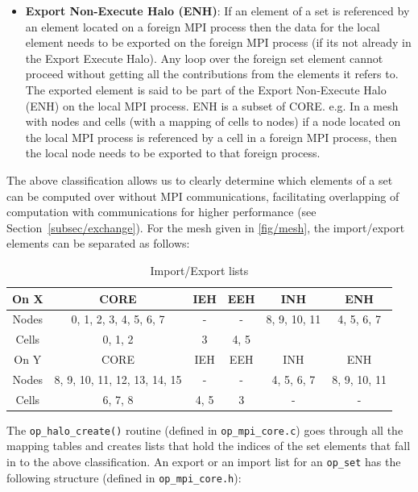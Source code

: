 \documentclass[11pt]{article}
\begin{document}
\begin{itemize}
\item \textbf{Export Non-Execute Halo (ENH)}: If an element of a set is referenced by an element located on a foreign
MPI process then the data for the local element needs to be exported on the foreign MPI process (if its not already in
the Export Execute Halo). Any loop over the foreign set element cannot proceed without getting all the contributions
from the elements it refers to. The exported element is said to be part of the Export Non-Execute Halo (ENH) on the
local MPI process. ENH is a subset of CORE. e.g. In a mesh with nodes and cells (with a mapping of cells to nodes) if a
node located on the local MPI process is referenced by a cell in a foreign MPI process, then the local node needs to be
exported to that foreign process.
\end{itemize}

\noindent The above classification allows us to clearly determine which elements of a set can be computed over without
MPI communications, facilitating overlapping of computation with communications for higher performance (see
Section~\ref{subsec/exchange}). For the mesh given in \figurename{ \ref{fig/mesh}}, the import/export elements can be
separated as follows:


\begin{table}[ht]
\centering\vspace{-10pt}
\caption{Import/Export lists}
\begin{tabular}{|c|c|c|c|c|c|} \hline
On X  & CORE        & IEH & EEH   & INH   & ENH     \\\hline
Nodes & 0, 1, 2, 3, 4, 5, 6, 7  & - & - & 8, 9, 10, 11  & 4, 5, 6, 7  \\\hline
Cells & 0, 1, 2     & 3 & 4, 5  &   &\\\hline\hline
On Y  & CORE        & IEH & EEH & INH   & ENH \\\hline
Nodes & 8, 9, 10, 11, 12, 13, 14, 15  & - & - & 4, 5, 6, 7  & 8, 9, 10, 11  \\\hline
Cells & 6, 7, 8     & 4, 5  & 3 & -   & -   \\\hline
\end{tabular}\label{tab/impexp}\vspace{-0pt}
\end{table}

\noindent The \texttt{op\_halo\_create()} routine (defined in \texttt{op\_mpi\_core.c}) goes
through all the mapping tables and creates lists that hold the indices of the set elements that fall in to the above
classification. An export or an import list for an \texttt{op\_set} has the following structure (defined in
\texttt{op\_mpi\_core.h}):
\end{document}
